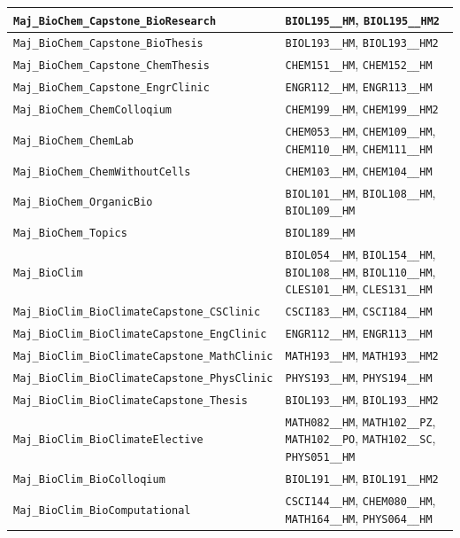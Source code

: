 \begin{longtable}{|p{4.4in}|p{4.4in}|}
    \verb|Maj_BioChem_Capstone_BioResearch| & \verb|BIOL195__HM|, \verb|BIOL195__HM2|\\\hline
    \verb|Maj_BioChem_Capstone_BioThesis| & \verb|BIOL193__HM|, \verb|BIOL193__HM2|\\\hline
    \verb|Maj_BioChem_Capstone_ChemThesis| & \verb|CHEM151__HM|, \verb|CHEM152__HM|\\\hline
    \verb|Maj_BioChem_Capstone_EngrClinic| & \verb|ENGR112__HM|, \verb|ENGR113__HM|\\\hline
    \verb|Maj_BioChem_ChemColloqium| & \verb|CHEM199__HM|, \verb|CHEM199__HM2|\\\hline
    \verb|Maj_BioChem_ChemLab| & \verb|CHEM053__HM|, \verb|CHEM109__HM|, \verb|CHEM110__HM|, \verb|CHEM111__HM|\\\hline
    \verb|Maj_BioChem_ChemWithoutCells| & \verb|CHEM103__HM|, \verb|CHEM104__HM|\\\hline
    \verb|Maj_BioChem_OrganicBio| & \verb|BIOL101__HM|, \verb|BIOL108__HM|, \verb|BIOL109__HM|\\\hline
    \verb|Maj_BioChem_Topics| & \verb|BIOL189__HM|\\\hline
    \verb|Maj_BioClim| & \verb|BIOL054__HM|, \verb|BIOL154__HM|, \verb|BIOL108__HM|, \verb|BIOL110__HM|, \verb|CLES101__HM|, \verb|CLES131__HM|\\\hline
    \verb|Maj_BioClim_BioClimateCapstone_CSClinic| & \verb|CSCI183__HM|, \verb|CSCI184__HM|\\\hline
    \verb|Maj_BioClim_BioClimateCapstone_EngClinic| & \verb|ENGR112__HM|, \verb|ENGR113__HM|\\\hline
    \verb|Maj_BioClim_BioClimateCapstone_MathClinic| & \verb|MATH193__HM|, \verb|MATH193__HM2|\\\hline
    \verb|Maj_BioClim_BioClimateCapstone_PhysClinic| & \verb|PHYS193__HM|, \verb|PHYS194__HM|\\\hline
    \verb|Maj_BioClim_BioClimateCapstone_Thesis| & \verb|BIOL193__HM|, \verb|BIOL193__HM2|\\\hline
    \verb|Maj_BioClim_BioClimateElective| & \verb|MATH082__HM|, \verb|MATH102__PZ|, \verb|MATH102__PO|, \verb|MATH102__SC|, \verb|PHYS051__HM|\\\hline
    \verb|Maj_BioClim_BioColloqium| & \verb|BIOL191__HM|, \verb|BIOL191__HM2|\\\hline
    \verb|Maj_BioClim_BioComputational| & \verb|CSCI144__HM|, \verb|CHEM080__HM|, \verb|MATH164__HM|, \verb|PHYS064__HM|\\\hline

\end{longtable}
